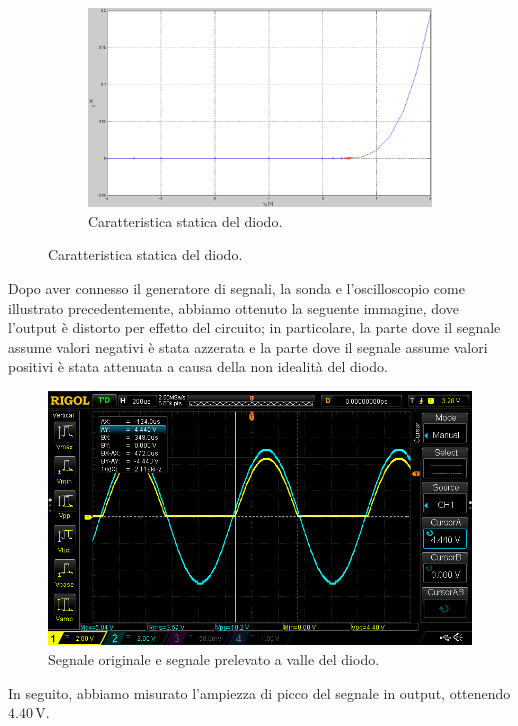 \documentclass[a4paper]{article}
\begin{document}
{{				\begin{figure}[h!]
					\centering
					\begin{subfigure}{0.4\textwidth}
						\centering
						\includegraphics[scale=0.3]{caratteristicheStaticheDiodoCaratteristica}
						\caption{Caratteristica statica del diodo.}
					\end{subfigure}
					\label{fig:caratteristicheStaticheDiodo}
				\end{figure}
				\newline
				Dopo aver connesso il generatore di segnali, la sonda e l'oscilloscopio  come illustrato precedentemente, abbiamo ottenuto la seguente immagine, dove l'output è distorto per effetto del circuito; in particolare, la parte dove il segnale assume valori negativi è stata azzerata e la parte dove il segnale assume valori positivi è stata attenuata a causa della non idealità del diodo.
				\begin{figure}[h!]
					\centering
					\includegraphics[scale=0.5]{ampiezzaDiPiccoDiodo}
					\caption{Segnale originale e segnale prelevato a valle del diodo.}
					\label{fig:ampiezzaDiPiccoDiodo}
				\end{figure}
				\newpage
				In seguito, abbiamo misurato l'ampiezza di picco del segnale in output, ottenendo $ 4.40 \, \mathrm{V} $.
}}
\end{document}
